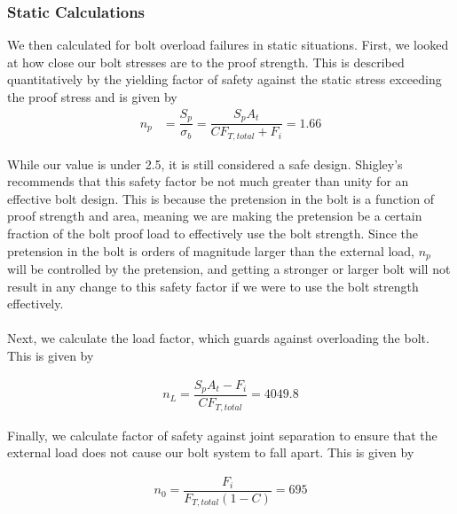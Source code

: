 \documentclass[letterpaper,12pt]{article}
\begin{document}
\subsubsection{Static Calculations}

We then calculated for bolt overload failures in static situations. First, we looked at how close our bolt stresses are to the proof strength. This is described quantitatively by the yielding factor of safety against the static stress exceeding the proof stress and is given by 
\begin{align*}
    n _ { p } &= \dfrac { S _ { p } } { \sigma _ { b } } = \dfrac { S _ { p } A _ { t } } { C F_{T,total} + F _ { i } } = 1.66
\end{align*}

While our value is under 2.5, it is still considered a safe design. Shigley's recommends that this safety factor be not much greater than unity for an effective bolt design. This is because the pretension in the bolt is a function of proof strength and area, meaning we are making the pretension be a certain fraction of the bolt proof load to effectively use the bolt strength. Since the pretension in the bolt is orders of magnitude larger than the external load, $n_p$ will be controlled by the pretension, and getting a stronger or larger bolt will not result in any change to this safety factor if we were to use the bolt strength effectively.\\\\

Next, we calculate the load factor, which guards against overloading the bolt. This is given by

\begin{align*}
    n _ { L } = \dfrac { S _ { p } A _ { t } - F _ { i } } { C F_{T,total} } = 4049.8
\end{align*}

Finally, we calculate factor of safety against joint separation to ensure that the external load does not cause our bolt system to fall apart. This is given by

\begin{align*}
    n _ { 0 } = \dfrac { F _ { i } } { F_{T,total} ( 1 - C ) } = 695
\end{align*}
\end{document}

